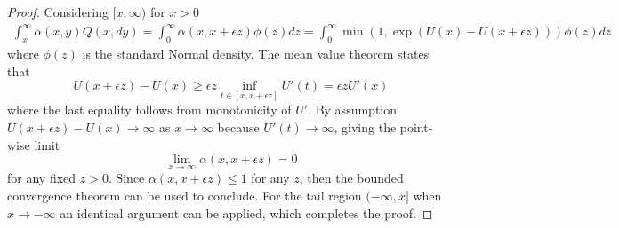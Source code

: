 \documentclass{article}
\theoremstyle{definition}
\theoremstyle{plain}
\begin{document}
\begin{proof}
Considering $[x, \infty)$ for $x>0$
\begin{equation*}
\begin{aligned}
    \int_x^\infty \alpha(x,y)Q(x,dy) = \int_{0}^{\infty} \alpha(x, x+\epsilon z)\phi(z) dz
    = 
    \int_0^{\infty} \min(1, \exp(U(x) - U(x+\epsilon z)))\phi(z)dz
\end{aligned}
\end{equation*}
where $\phi(z)$ is the standard Normal density. The mean value theorem states that
\begin{equation*}
    U(x+\epsilon z) - U(x) \geq \epsilon z \inf_{t \in [x, x+\epsilon z]} U'(t) = \epsilon z U'(x)
\end{equation*}
where the last equality follows from monotonicity of $U'$.  By assumption $U(x+\epsilon z) -  U(x) \to \infty$ as $x \to \infty$ because $U'(t) \to \infty$, giving the point-wise limit
\begin{equation*}
    \lim_{x\to \infty}\alpha(x, x+\epsilon z) = 0
\end{equation*}
for any fixed $z > 0$. Since $\alpha(x,x+\epsilon z) \leq 1$ for any $z$, then the bounded convergence theorem can be used to conclude.  For the tail region $(-\infty, x]$ when $x \to -\infty$ an identical argument can be applied, which completes the proof.
\end{proof}

\end{document}
